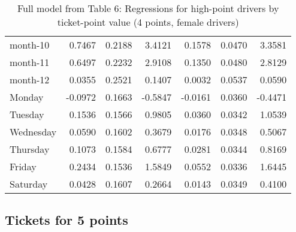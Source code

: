 \documentclass[10pt]{article}
\begin{document}
\begin{table}[ht]
\begin{tabular}{lrrrrrr}
  month-10 & 0.7467 & 0.2188 & 3.4121 & 0.1578 & 0.0470 & 3.3581 \\ 
  month-11 & 0.6497 & 0.2232 & 2.9108 & 0.1350 & 0.0480 & 2.8129 \\ 
  month-12 & 0.0355 & 0.2521 & 0.1407 & 0.0032 & 0.0537 & 0.0590 \\ 
  Monday & -0.0972 & 0.1663 & -0.5847 & -0.0161 & 0.0360 & -0.4471 \\ 
  Tuesday & 0.1536 & 0.1566 & 0.9805 & 0.0360 & 0.0342 & 1.0539 \\ 
  Wednesday & 0.0590 & 0.1602 & 0.3679 & 0.0176 & 0.0348 & 0.5067 \\ 
  Thursday & 0.1073 & 0.1584 & 0.6777 & 0.0281 & 0.0344 & 0.8169 \\ 
  Friday & 0.2434 & 0.1536 & 1.5849 & 0.0552 & 0.0336 & 1.6445 \\ 
  Saturday & 0.0428 & 0.1607 & 0.2664 & 0.0143 & 0.0349 & 0.4100 \\ 
   \hline
\end{tabular}
\caption{Full model from Table 6: Regressions for high-point drivers by ticket-point value (4 points, female drivers)} 
\label{tab_6_4_pts_no_age_F}
\end{table}


\clearpage
\pagebreak




\subsection{Tickets for 5 points}



\end{document}
